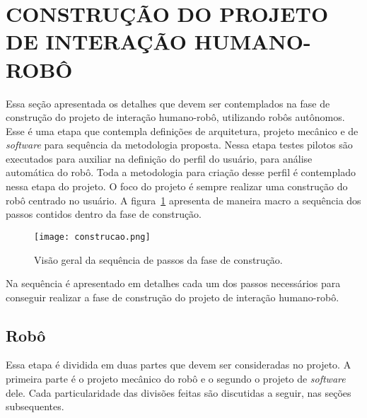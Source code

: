 \section{CONSTRUÇÃO DO PROJETO DE INTERAÇÃO HUMANO-ROBÔ}
\label{sec:construcao}
Essa seção apresentada os detalhes que devem ser contemplados na fase de construção do projeto de interação humano-robô, utilizando robôs autônomos. Esse é uma etapa que contempla definições de arquitetura, projeto mecânico e de \textit{software} para sequência da metodologia proposta. Nessa etapa testes pilotos são executados para auxiliar na definição do perfil do usuário, para análise automática do robô. Toda a metodologia para criação desse perfil é contemplado nessa etapa do projeto. O foco do projeto é sempre realizar uma construção do robô centrado no usuário. A figura~\ref{fig:construcao} apresenta de maneira macro a sequência dos passos contidos dentro da fase de construção.

\begin{figure}[ht!]
    \centering
    \begin{minipage}{\textwidth}
        \caption{Visão geral da sequência de passos da fase de construção.}
        \texttt{[image: construcao.png]}
        \label{fig:construcao}
    \end{minipage}
\end{figure}

Na sequência é apresentado em detalhes cada um dos passos necessários para conseguir realizar a fase de construção do projeto de interação humano-robô.

\subsection{Robô}
\label{sec:robo}
Essa etapa é dividida em duas partes que devem ser consideradas no projeto. A primeira parte é o projeto mecânico do robô e o segundo o projeto de \textit{software} dele. Cada particularidade das divisões feitas são discutidas a seguir, nas seções subsequentes.

